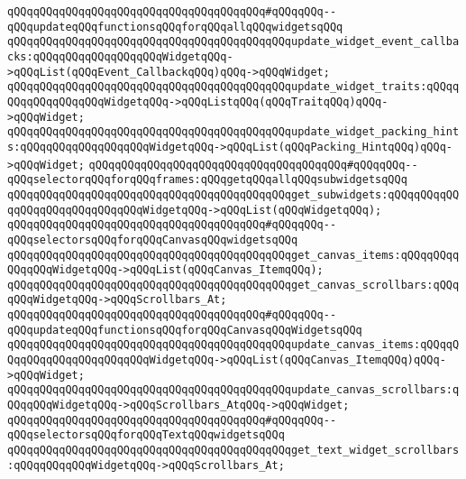 \newline
\verb|qQQqqQQqqQQqqQQqqQQqqQQqqQQqqQQqqQQqqQQq#qQQqqQQq--qQQqupdateqQQqfunctionsqQQqforqQQqallqQQqwidgetsqQQq|\newline
\verb|qQQqqQQqqQQqqQQqqQQqqQQqqQQqqQQqqQQqqQQqqQQqupdate_widget_event_callbacks:qQQqqQQqqQQqqQQqqQQqWidgetqQQq->qQQqList(qQQqEvent_CallbackqQQq)qQQq->qQQqWidget;|\newline
\verb|qQQqqQQqqQQqqQQqqQQqqQQqqQQqqQQqqQQqqQQqqQQqupdate_widget_traits:qQQqqQQqqQQqqQQqqQQqWidgetqQQq->qQQqListqQQq(qQQqTraitqQQq)qQQq->qQQqWidget;|\newline
\verb|qQQqqQQqqQQqqQQqqQQqqQQqqQQqqQQqqQQqqQQqqQQqupdate_widget_packing_hints:qQQqqQQqqQQqqQQqqQQqWidgetqQQq->qQQqList(qQQqPacking_HintqQQq)qQQq->qQQqWidget;|\newline
\newline
\verb|qQQqqQQqqQQqqQQqqQQqqQQqqQQqqQQqqQQqqQQq#qQQqqQQq--qQQqselectorqQQqforqQQqframes:qQQqgetqQQqallqQQqsubwidgetsqQQq|\newline
\verb|qQQqqQQqqQQqqQQqqQQqqQQqqQQqqQQqqQQqqQQqqQQqget_subwidgets:qQQqqQQqqQQqqQQqqQQqqQQqqQQqqQQqWidgetqQQq->qQQqList(qQQqWidgetqQQq);|\newline
\newline
\verb|qQQqqQQqqQQqqQQqqQQqqQQqqQQqqQQqqQQqqQQq#qQQqqQQq--qQQqselectorsqQQqforqQQqCanvasqQQqwidgetsqQQq|\newline
\verb|qQQqqQQqqQQqqQQqqQQqqQQqqQQqqQQqqQQqqQQqqQQqget_canvas_items:qQQqqQQqqQQqqQQqWidgetqQQq->qQQqList(qQQqCanvas_ItemqQQq);|\newline
\verb|qQQqqQQqqQQqqQQqqQQqqQQqqQQqqQQqqQQqqQQqqQQqget_canvas_scrollbars:qQQqqQQqWidgetqQQq->qQQqScrollbars_At;|\newline
\newline
\verb|qQQqqQQqqQQqqQQqqQQqqQQqqQQqqQQqqQQqqQQq#qQQqqQQq--qQQqupdateqQQqfunctionsqQQqforqQQqCanvasqQQqWidgetsqQQq|\newline
\verb|qQQqqQQqqQQqqQQqqQQqqQQqqQQqqQQqqQQqqQQqqQQqupdate_canvas_items:qQQqqQQqqQQqqQQqqQQqqQQqqQQqWidgetqQQq->qQQqList(qQQqCanvas_ItemqQQq)qQQq->qQQqWidget;|\newline
\verb|qQQqqQQqqQQqqQQqqQQqqQQqqQQqqQQqqQQqqQQqqQQqupdate_canvas_scrollbars:qQQqqQQqWidgetqQQq->qQQqScrollbars_AtqQQq->qQQqWidget;|\newline
\newline
\verb|qQQqqQQqqQQqqQQqqQQqqQQqqQQqqQQqqQQqqQQq#qQQqqQQq--qQQqselectorsqQQqforqQQqTextqQQqwidgetsqQQq|\newline
\verb|qQQqqQQqqQQqqQQqqQQqqQQqqQQqqQQqqQQqqQQqqQQqget_text_widget_scrollbars:qQQqqQQqqQQqWidgetqQQq->qQQqScrollbars_At;|\newline
